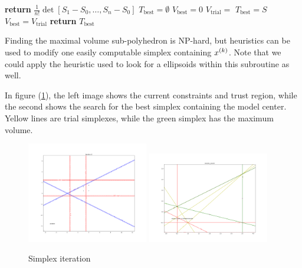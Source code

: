 \documentclass{article}
\let\oldref\ref
\renewcommand{\ref}[1]{(\oldref{#1})}
\begin{document}
\begin{algorithmic}
    \State \textbf{return} $\frac 1 {n!} \det{[S_1 - S_0, \ldots, S_n - S_0]}$
\EndProcedure
{}
    \State $T_{\text{best}} = \emptyset$
    \State $V_{\text{best}} = 0$
        \EndIf
        \EndIf
        \State $V_{\text{trial}} = $ 
            \State $T_{\text{best}} = S$
            \State $V_{\text{best}} = V_{\text{trial}}$
        \EndIf{}
    \EndFor
    \State \textbf{return} $T_{\text{best}}$
\EndProcedure
\end{algorithmic}


Finding the maximal volume sub-polyhedron is NP-hard, but heuristics can be used to modify one easily computable simplex containing ${x}^{(k)}$.
Note that we could apply the heuristic used to look for a ellipsoids within this subroutine as well.

In figure \ref{simplex_iterations}, the left image shows the current constraints and trust region, while the second shows the search for the best simplex containing the model center.
Yellow lines are trial simplexes, while the green simplex has the maximum volume.

\begin{figure}[h]
    \centering
    \includegraphics[width=200px]{images/simplex_iteration.png}
    \includegraphics[width=200px]{images/simplex_search.png}
    \caption{Simplex iteration}
    \label{simplex_iterations}
\end{figure}
\end{document}

